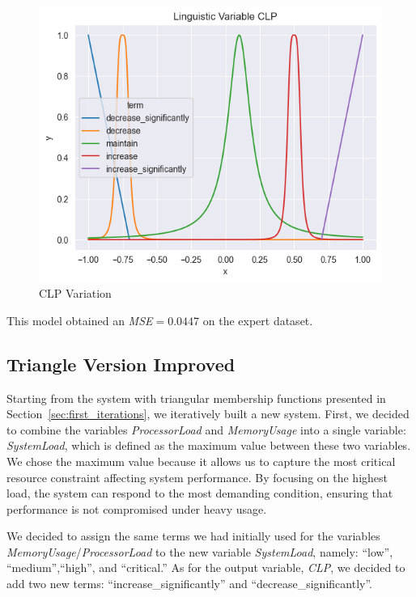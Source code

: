 \documentclass[titlepage]{article}
\begin{document}
\begin{figure}[htbp]
\begin{minipage}{0.32\textwidth}
    \end{minipage}
    \hfill
    \begin{minipage}{0.32\textwidth}
        \centering
        \includegraphics[width=\textwidth]{../images/bell_v9/CLP}
        \caption{CLP Variation}
        \label{fig:bellv9_clp}
    \end{minipage}
    \label{fig:fuzzy_sets_bellv9}
\end{figure}

This model obtained an \emph{MSE}$=0.0447$ on the expert dataset.

\subsection{Triangle Version Improved}

Starting from the system with triangular membership functions presented in Section~\ref{sec:first_iterations}, we iteratively built a new system.
First, we decided to combine the variables \textit{ProcessorLoad} and \textit{MemoryUsage} into a single variable: \textit{SystemLoad}, which is defined as the maximum value between these two variables. We chose the maximum value because it allows us to capture the most critical resource constraint affecting system performance. By focusing on the highest load, the system can respond to the most demanding condition, ensuring that performance is not compromised under heavy usage.


We decided to assign the same terms we had initially used for the variables \textit{MemoryUsage}/\textit{ProcessorLoad} to the new variable \textit{SystemLoad}, namely: ``low'', ``medium'',``high'', and ``critical.'' As for the output variable, \textit{CLP}, we decided to add two new terms: ``increase\_significantly'' and ``decrease\_significantly''.
\end{document}
